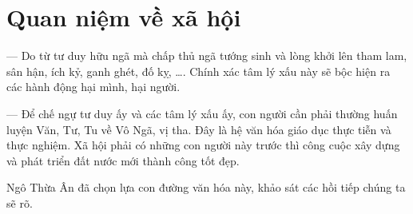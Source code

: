 \section{Quan niệm về xã hội} %
\label{sec:23_xa_hoi}

— Do từ tư duy hữu ngã mà chấp thủ ngã tướng sinh và lòng khởi lên tham lam, sân hận, ích kỷ, ganh ghét, đố kỵ, \ldots. Chính xác tâm lý xấu này sẽ bộc hiện ra các hành động hại mình, hại người.

— Để chế ngự tư duy ấy và các tâm lý xấu ấy, con người cần phải thường huấn luyện Văn, Tư, Tu về Vô Ngã, vị tha. Đây là hệ văn hóa giáo dục thực tiễn và thực nghiệm. Xã hội phải có những con người này trước thì công cuộc xây dựng và phát triển đất nước mới thành công tốt đẹp.

Ngô Thừa Ân đã chọn lựa con đường văn hóa này, khảo sát các hồi tiếp chúng ta sẽ rõ.
